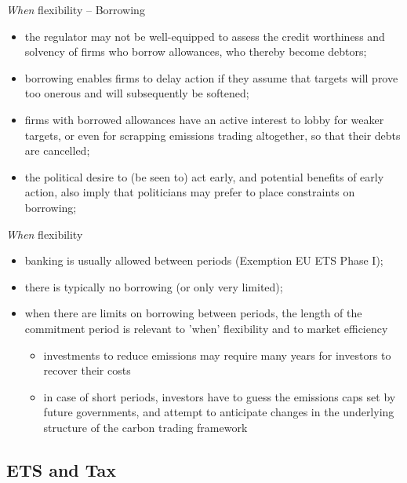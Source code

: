 {{\it When} flexibility -- Borrowing}
\begin{itemize}
\item<1-> the regulator may not be well-equipped to assess the credit worthiness and
solvency of firms who borrow allowances, who thereby become debtors;
\item<2-> borrowing enables firms to delay action if they assume that targets will prove too
onerous and will subsequently be softened;
\item<3-> firms with borrowed allowances have an active interest to lobby for weaker targets,
or even for scrapping emissions trading altogether, so that their debts are cancelled;
\item<4-> the political desire to (be seen to) act early, and potential benefits of early action,
also imply that politicians may prefer to place constraints on borrowing;

\end{itemize}


{{\it When} flexibility}
\begin{itemize}
\item<1-> banking is usually allowed between periods (Exemption EU ETS Phase I);
\item<2-> there is typically no borrowing (or only very limited);
\item<3-> when there are limits on borrowing between periods, the length of the commitment period is relevant to 'when' flexibility
and to market efficiency
\begin{itemize}
\item investments to reduce
emissions may require many years for investors to recover their costs
\item in case of short periods, investors have to guess the emissions caps set by
future governments, and attempt to anticipate changes in the underlying structure of the
carbon trading framework
\end{itemize}
\end{itemize}



\subsection{ETS and Tax}

